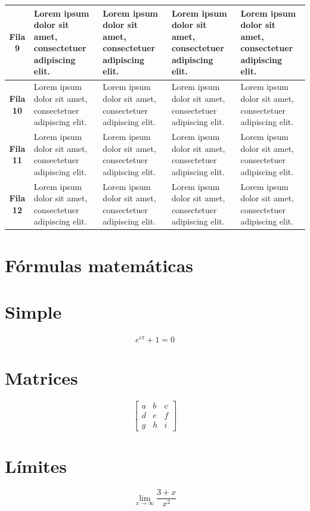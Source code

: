 \begin{longtable}{p{2cm}|p{3cm}|p{3cm}|p{3cm}|p{3cm}|}
    \multicolumn{1}{|c|}{\textbf{Fila 9}} & Lorem ipsum dolor sit amet, consectetuer adipiscing elit. & Lorem ipsum dolor sit amet, consectetuer adipiscing elit. & Lorem ipsum dolor sit amet, consectetuer adipiscing elit. & Lorem ipsum dolor sit amet, consectetuer adipiscing elit. \\ \hline    
    \multicolumn{1}{|c|}{\textbf{Fila 10}} & Lorem ipsum dolor sit amet, consectetuer adipiscing elit. & Lorem ipsum dolor sit amet, consectetuer adipiscing elit. & Lorem ipsum dolor sit amet, consectetuer adipiscing elit. & Lorem ipsum dolor sit amet, consectetuer adipiscing elit. \\ \hline    
    \multicolumn{1}{|c|}{\textbf{Fila 11}} & Lorem ipsum dolor sit amet, consectetuer adipiscing elit. & Lorem ipsum dolor sit amet, consectetuer adipiscing elit. & Lorem ipsum dolor sit amet, consectetuer adipiscing elit. & Lorem ipsum dolor sit amet, consectetuer adipiscing elit. \\ \hline    
    \multicolumn{1}{|c|}{\textbf{Fila 12}} & Lorem ipsum dolor sit amet, consectetuer adipiscing elit. & Lorem ipsum dolor sit amet, consectetuer adipiscing elit. & Lorem ipsum dolor sit amet, consectetuer adipiscing elit. & Lorem ipsum dolor sit amet, consectetuer adipiscing elit. \\ \hline    
\end{longtable}

\section{Fórmulas matemáticas}

\section*{Simple}
\begin{equation}
    e^{i\pi} + 1 = 0
    \label{eq:euler}
\end{equation}

\section*{Matrices}
\begin{equation}
    \left[
    \begin{matrix}
     a & b & c \\
     d & e & f \\
     g & h & i
    \end{matrix}
    \right]
    \label{eq:matriz}
\end{equation}

\section*{Límites}
\begin{equation}
    \lim_{x\rightarrow\infty}\frac{3+x}{x^2} 
    \label{eq:limites}
\end{equation}